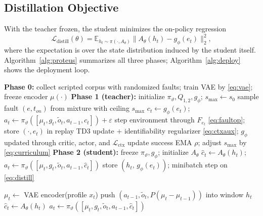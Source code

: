 \documentclass[journal]{IEEEtran}
\newcommand{\ehat}{\hat{c}}
\newcommand{\E}{\mathbb{E}}
\begin{document}
\subsection{Distillation Objective}
With the teacher frozen, the student minimizes the on-policy regression
\begin{equation}
\mathcal{L}_{\mathrm{distill}}(\theta) =
\E_{h_t \sim \pi(\cdot, A_\theta)}
\big\lVert A_\theta(h_t) - g_\phi(e_t) \big\rVert_2^2 ,
\label{eq:distill}
\end{equation}
where the expectation is over the state distribution induced by the student
itself. Algorithm~\ref{alg:proteus} summarizes all three phases;
Algorithm~\ref{alg:deploy} shows the deployment loop.

\begin{algorithm}[!t]
\caption{PROTEUS three-phase training}
\label{alg:proteus}
\begin{algorithmic}[1]
\State \textbf{Phase 0:} collect scripted corpus with randomized faults;
train VAE by \eqref{eq:vae}; freeze encoder $\mu(\cdot)$
\State \textbf{Phase 1 (teacher):} initialize $\pi_\vartheta, Q_{1,2},
g_\phi$; $s_{\max} \gets s_0$
  \State sample fault $(e, t_{on})$ from mixture with ceiling $s_{\max}$
    \State $c_t \gets g_\phi(e_t)$;\;
           $a_t \gets \pi_\vartheta([\mu_t, g_t, \tilde{o}_t, a_{t-1}, c_t])
           + \varepsilon$
    \State step environment through $F_{e_t}$ \eqref{eq:faultop}; store
           $(\cdot, e_t)$ in replay
    \State TD3 update $+$ identifiability regularizer \eqref{eq:ctxaux};
           $g_\phi$ updated through critic, actor, and $\mathcal{L}_{\mathrm{ctx}}$
  \EndFor
  \State update success EMA $\rho$; adjust $s_{\max}$ by
         \eqref{eq:curriculum}
\EndFor
\State \textbf{Phase 2 (student):} freeze $\pi_\vartheta, g_\phi$;
initialize $A_\theta$
    \State $\ehat_t \gets A_\theta(h_t)$;\;
           $a_t \gets \pi_\vartheta([\mu_t, g_t, \tilde{o}_t, a_{t-1},
           \ehat_t])$ 
    \State store $(h_t,\, g_\phi(e_t))$; minibatch step on
           \eqref{eq:distill}
  \EndFor
\EndFor
\end{algorithmic}
\end{algorithm}

\begin{algorithm}[!t]
\caption{PROTEUS deployment (per decision)}
\label{alg:deploy}
\begin{algorithmic}[1]
\State $\mu_t \gets$ VAE encoder(profile $x_t$)
\State push $(a_{t-1}, \tilde{o}_t, P(\mu_t - \mu_{t-1}))$ into window $h_t$
\State $\ehat_t \gets A_\theta(h_t)$ 
\State $a_t \gets \pi_\vartheta([\mu_t, g_t, \tilde{o}_t, a_{t-1},
\ehat_t])$
\end{algorithmic}
\end{algorithm}
\end{document}
